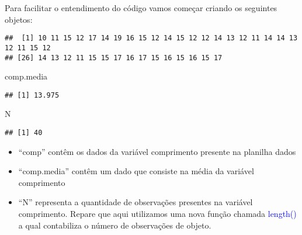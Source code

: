 \documentclass[titlepage, oneside, openany, a4paper]{book}
\newenvironment{Shaded}{\begin{snugshade}}{\end{snugshade}}
\newcommand{\KeywordTok}[1]{\textcolor[rgb]{0.13,0.29,0.53}{\textbf{#1}}}
\newcommand{\NormalTok}[1]{#1}
\newcommand{\OperatorTok}[1]{\textcolor[rgb]{0.81,0.36,0.00}{\textbf{#1}}}
\newcommand{\StringTok}[1]{\textcolor[rgb]{0.31,0.60,0.02}{#1}}
\providecommand{\tightlist}{%
  \setlength{\itemsep}{0pt}\setlength{\parskip}{0pt}}
\begin{document}
Para facilitar o entendimento do código vamos começar criando os seguintes objetos:

\begin{Shaded}
\end{Shaded}

\begin{verbatim}
##  [1] 10 11 15 12 17 14 19 16 15 12 14 15 12 12 14 13 12 11 14 14 13 12 11 15 12
## [26] 14 13 12 11 15 15 17 16 17 15 16 15 16 15 17
\end{verbatim}

\begin{Shaded}
\begin{Highlighting}[]
\NormalTok{comp.media}
\end{Highlighting}
\end{Shaded}

\begin{verbatim}
## [1] 13.975
\end{verbatim}

\begin{Shaded}
\begin{Highlighting}[]
\NormalTok{N}
\end{Highlighting}
\end{Shaded}

\begin{verbatim}
## [1] 40
\end{verbatim}

\begin{itemize}
\tightlist
\item
  ``comp'' contêm os dados da variável comprimento presente na planilha dados
\item
  ``comp.media'' contêm um dado que consiste na média da variável comprimento
\item
  ``N'' representa a quantidade de observações presentes na variável comprimento. Repare que aqui utilizamos uma nova função chamada \textcolor{blue}{length()} a qual contabiliza o número de observações de objeto.
\end{itemize}
\end{document}
